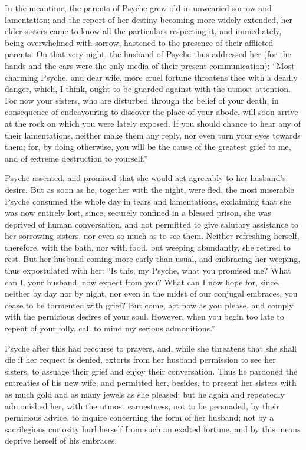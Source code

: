 \documentclass{article}
\begin{document}
In the meantime, the parents of Psyche grew old in unwearied sorrow and
lamentation; and the report of her destiny becoming more widely extended, her
elder sisters came to know all the particulars respecting it, and immediately,
being overwhelmed with sorrow, hastened to the presence of their afflicted
parents. On that very night, the husband of Psyche thus addressed her (for the
hands and the ears were the only media of their present communication): ``Most
charming Psyche, and dear wife, more cruel fortune threatens thee with a deadly
danger, which, I think, ought to be guarded against with the utmost attention.
For now your sisters, who are disturbed through the belief of your death, in
consequence of endeavouring to discover the place of your abode, will soon
arrive at the rock on which you were lately exposed. If you should chance to
hear any of their lamentations, neither make them any reply, nor even turn your
eyes towards them; for, by doing otherwise, you will be the cause of the
greatest grief to me, and of extreme destruction to yourself.''

Psyche assented, and promised that she would act agreeably to her husband's
desire. But as soon as he, together with the night, were fled, the most
miserable Psyche consumed the whole day in tears and lamentations, exclaiming
that she was now entirely lost, since, securely confined in a blessed prison,
she was deprived of human conversation, and not permitted to give salutary
assistance to her sorrowing sisters, nor even so much as to see them. Neither
refreshing herself, therefore, with the bath, nor with food, but weeping
abundantly, she retired to rest. But her husband coming more early than usual,
and embracing her weeping, thus expostulated with her: ``Is this, my Psyche,
what you promised me? What can I, your husband, now expect from you? What can I
now hope for, since, neither by day nor by night, nor even in the midst of our
conjugal embraces, you cease to be tormented with grief? But come, act now as
you please, and comply with the pernicious desires of your soul. However, when
you begin too late to repent of your folly, call to mind my serious
admonitions.''

Psyche after this had recourse to prayers, and, while she threatens that she
shall die if her request is denied, extorts from her husband permission to see
her sisters, to assuage their grief and enjoy their conversation. Thus he
pardoned the entreaties of his new wife, and permitted her, besides, to present
her sisters with as much gold and as many jewels as she pleased; but he again
and repeatedly admonished her, with the utmost earnestness, not to be
persuaded, by their pernicious advice, to inquire concerning the form of her
husband; not by a sacrilegious curiosity hurl herself from such an exalted
fortune, and by this means deprive herself of his embraces.
\end{document}

